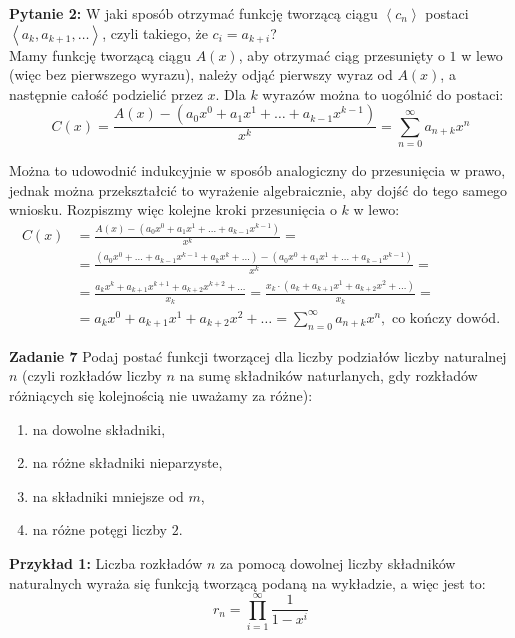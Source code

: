 \documentclass[a4paper,12pt]{article}
\newcommand{\sequence}[1]{\left\langle #1 \right\rangle} %
\begin{document}
\noindent\textbf{Pytanie 2:} W jaki sposób otrzymać funkcję tworzącą ciągu $\sequence{c_n}$ postaci $\sequence{a_k, a_{k+1}, \ldots}$, czyli takiego, że $c_i = a_{k + i}$? \\

\noindent Mamy funkcję tworzącą ciągu $A(x)$, aby otrzymać ciąg przesunięty o $1$ w lewo (więc bez pierwszego wyrazu), należy odjąć pierwszy wyraz od $A(x)$, a następnie całość podzielić przez $x$. Dla $k$ wyrazów można to uogólnić do postaci:
\[ C(x) = \frac{A(x) - \left(a_0 x^0 + a_1 x^1 + \ldots + a_{k-1} x^{k-1}\right)}{x^k} = \sum\limits_{n=0}^{\infty} a_{n + k} x^n \]

\noindent Można to udowodnić indukcyjnie w sposób analogiczny do przesunięcia w prawo, jednak można przekształcić to wyrażenie algebraicznie, aby dojść do tego samego wniosku. Rozpiszmy więc kolejne kroki przesunięcia o $k$ w lewo:
\begin{align*}
    C(x)    &= \frac{A(x) - \left(a_0 x^0 + a_1 x^1 + \ldots + a_{k-1} x^{k-1}\right)}{x^k} = \\
            &= \frac{\left(a_0 x^0 + \ldots + a_{k-1} x^{k-1} + a_k x^k + \ldots\right) - \left(a_0 x^0 + a_1 x^1 + \ldots + a_{k-1} x^{k-1}\right)}{x^k} = \\
            &= \frac{a_k x^k + a_{k+1} x^{k+1} + a_{k+2} x^{k+2} + \ldots}{x_k} = \frac{x_k \cdot \left( a_k + a_{k+1} x^1 + a_{k+2} x^2 + \ldots \right)}{x_k} =  \\ 
            &= a_k x^0 + a_{k+1} x^1 + a_{k+2} x^2 + \ldots = \sum\limits_{n=0}^{\infty} a_{n + k} x^n, \text{ co kończy dowód.}
\end{align*}

\newpage
\noindent \textbf{Zadanie 7} \newline
Podaj postać funkcji tworzącej dla liczby podziałów liczby naturalnej $n$ (czyli rozkładów liczby $n$ na sumę składników naturlanych, gdy rozkładów różniących się kolejnością nie uważamy za różne):
\begin{enumerate}
    \item na dowolne składniki,
    \item na różne składniki nieparzyste,
    \item na składniki mniejsze od $m$,
    \item na różne potęgi liczby $2$.
\end{enumerate}

\noindent \textbf{Przykład 1:} Liczba rozkładów $n$ za pomocą dowolnej liczby składników naturalnych wyraża się funkcją tworzącą podaną na wykładzie, a więc jest to: 
\[ r_n = \prod\limits_{i = 1}^{\infty} \frac{1}{1 - x^i} \]
\end{document}
